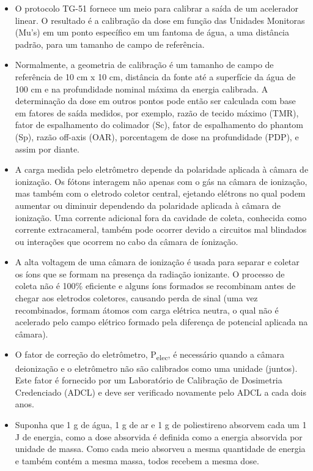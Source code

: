 \documentclass[11pt,a4paper]{article}
\newcounter{exemplo}
\begin{document}
\begin{exemplo}
\begin{itemize}
        \item O protocolo TG-51 fornece um meio para calibrar a saída de um acelerador linear. O resultado é a calibração da dose em função das Unidades Monitoras (Mu's) em um ponto específico em um fantoma de água, a uma distância padrão, para um tamanho de campo de referência.
        
        \item Normalmente, a geometria de calibração é um tamanho de campo de referência de 10 cm x 10 cm, distância da fonte até a superfície da água de 100 cm e na profundidade nominal máxima da energia calibrada. A determinação da dose em outros pontos pode então ser calculada com base em fatores de saída medidos, por exemplo, razão de tecido máximo (TMR), fator de espalhamento do colimador (Sc), fator de espalhamento do phantom (Sp), razão off-axis (OAR), porcentagem de dose na profundidade (PDP), e assim por diante.
        
        \item A carga medida pelo eletrômetro depende da polaridade aplicada à câmara de ionização. Os fótons interagem não apenas com o gás na câmara de ionização, mas também com o eletrodo coletor central, ejetando elétrons no qual podem aumentar ou diminuir dependendo da polaridade aplicada à câmara de ionização. Uma corrente adicional fora da cavidade de coleta, conhecida como corrente extracameral, também pode ocorrer devido a circuitos mal blindados ou interações que ocorrem no cabo da câmara de íonização.
        
        \item A alta voltagem de uma câmara de ionização é usada para separar e coletar os íons que se formam na presença da radiação ionizante. O processo de coleta não é 100\% eficiente e alguns íons formados se recombinam antes de chegar aos eletrodos coletores, causando perda de sinal (uma vez recombinados, formam átomos com carga elétrica neutra, o qual não é acelerado pelo campo elétrico formado pela diferença de potencial aplicada na câmara).
        
        \item O fator de correção do eletrômetro, P\textsubscript{elec}, é necessário quando a câmara deionização e o eletrômetro não são calibrados como uma unidade (juntos). Este fator é fornecido por um Laboratório de Calibração de Dosimetria Credenciado (ADCL) e deve ser verificado novamente pelo ADCL a cada dois anos.
        
        \item Suponha que 1 g de água, 1 g de ar e 1 g de poliestireno absorvem cada um 1 J de energia, como a dose absorvida é definida como a energia absorvida por unidade de massa. Como cada meio absorveu a mesma quantidade de energia e também contém a mesma massa, todos recebem a mesma dose.
        

\end{itemize}
\end{exemplo}
\end{document}
